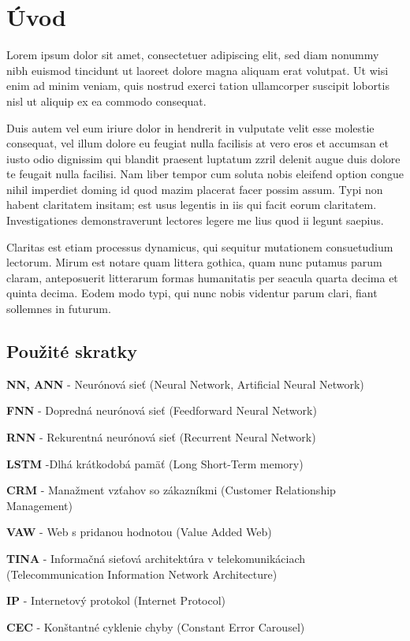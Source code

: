 \newpage
\chapter{Úvod}

Lorem ipsum dolor sit amet, consectetuer adipiscing elit, sed diam nonummy nibh euismod tincidunt ut laoreet dolore magna aliquam erat volutpat. Ut wisi enim ad minim veniam, quis nostrud exerci tation ullamcorper suscipit lobortis nisl ut aliquip ex ea commodo consequat.

Duis autem vel eum iriure dolor in hendrerit in vulputate velit esse molestie consequat, vel illum dolore eu feugiat nulla facilisis at vero eros et accumsan et iusto odio dignissim qui blandit praesent luptatum zzril delenit augue duis dolore te feugait nulla facilisi. Nam liber tempor cum soluta nobis eleifend option congue nihil imperdiet doming id quod mazim placerat facer possim assum. Typi non habent claritatem insitam; est usus legentis in iis qui facit eorum claritatem. Investigationes demonstraverunt lectores legere me lius quod ii legunt saepius. 

Claritas est etiam processus dynamicus, qui sequitur mutationem consuetudium lectorum. Mirum est notare quam littera gothica, quam nunc putamus parum claram, anteposuerit litterarum formas humanitatis per seacula quarta decima et quinta decima. Eodem modo typi, qui nunc nobis videntur parum clari, fiant sollemnes in futurum.

\section{Použité skratky}
\label{uvod_pouzite_skratky}

\begin{my_itemize}
\item \textbf{NN, ANN} - Neurónová sieť (Neural Network, Artificial Neural Network)
\item \textbf{FNN} - Dopredná neurónová sieť (Feedforward Neural Network)
\item \textbf{RNN} - Rekurentná neurónová sieť (Recurrent Neural Network)
\item \textbf{LSTM} -Dlhá krátkodobá pamäť (Long Short-Term memory)
\item \textbf{CRM} - Manažment vzťahov so zákazníkmi (Customer Relationship Management)
\item \textbf{VAW} - Web s pridanou hodnotou (Value Added Web)
\item \textbf{TINA} - Informačná sieťová architektúra v telekomunikáciach (Telecommunication Information Network Architecture)
\item \textbf{IP} - Internetový protokol (Internet Protocol)
\item \textbf{CEC} - Konštantné cyklenie chyby (Constant Error Carousel)
\end{my_itemize}

